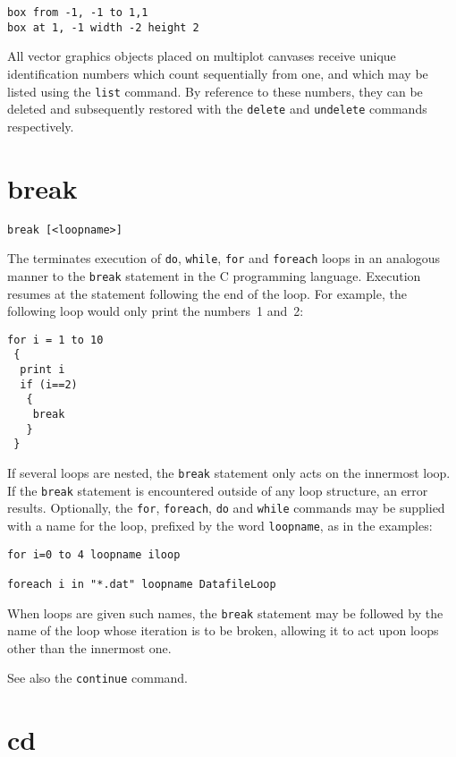 \begin{verbatim}
box from -1, -1 to 1,1
box at 1, -1 width -2 height 2
\end{verbatim}

All vector graphics objects placed on multiplot canvases receive unique
identification numbers which count sequentially from one, and which may be
listed using the {\tt list} command.  By reference to these numbers, they can
be deleted and subsequently restored with the {\tt delete} and {\tt undelete}
commands respectively.


\section{break}

\begin{verbatim}
break [<loopname>]
\end{verbatim}

The  terminates execution of {\tt do}, {\tt while}, {\tt for}
and {\tt foreach} loops in an analogous manner to the {\tt break} statement in
the C programming language.  Execution resumes at the statement following the
end of the loop. For example, the following loop would only print the numbers~1
and~2:

\begin{verbatim}
for i = 1 to 10
 {
  print i
  if (i==2)
   {
    break
   }
 }
\end{verbatim}

If several loops are nested, the {\tt break} statement only acts on the
innermost loop. If the {\tt break} statement is encountered outside of any loop
structure, an error results. Optionally, the {\tt for}, {\tt foreach}, {\tt do}
and {\tt while} commands may be supplied with a name for the loop, prefixed by
the word {\tt loopname}, as in the examples:

\begin{verbatim}
for i=0 to 4 loopname iloop

foreach i in "*.dat" loopname DatafileLoop
\end{verbatim}

\noindent When loops are given such names, the {\tt break} statement may be
followed by the name of the loop whose iteration is to be broken, allowing it
to act upon loops other than the innermost one.

See also the {\tt continue} command.


\section{cd}

